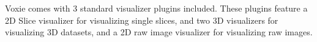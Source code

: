Voxie comes with 3 standard visualizer plugins included. These plugins feature a 2D Slice visualizer for visualizing single slices, and two 3D visualizers for visualizing 3D datasets, and a 2D raw image visualizer for visualizing raw images.
